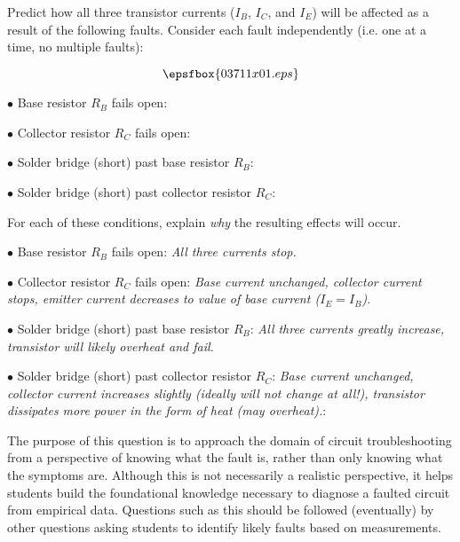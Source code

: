 

Predict how all three transistor currents ($I_B$, $I_C$, and $I_E$) will be affected as a result of the following faults.  Consider each fault independently (i.e. one at a time, no multiple faults):

$$\epsfbox{03711x01.eps}$$

\medskip
\item{$\bullet$} Base resistor $R_B$ fails open:
\vskip 5pt
\item{$\bullet$} Collector resistor $R_C$ fails open:
\vskip 5pt
\item{$\bullet$} Solder bridge (short) past base resistor $R_B$:
\vskip 5pt
\item{$\bullet$} Solder bridge (short) past collector resistor $R_C$:
\medskip

For each of these conditions, explain {\it why} the resulting effects will occur.







\medskip
\item{$\bullet$} Base resistor $R_B$ fails open: {\it All three currents stop.}
\vskip 5pt
\item{$\bullet$} Collector resistor $R_C$ fails open: {\it Base current unchanged, collector current stops, emitter current decreases to value of base current ($I_E = I_B$).}
\vskip 5pt
\item{$\bullet$} Solder bridge (short) past base resistor $R_B$: {\it All three currents greatly increase, transistor will likely overheat and fail.}
\vskip 5pt
\item{$\bullet$} Solder bridge (short) past collector resistor $R_C$: {\it Base current unchanged, collector current increases slightly (ideally will not change at all!), transistor dissipates more power in the form of heat (may overheat).}:
\medskip







The purpose of this question is to approach the domain of circuit troubleshooting from a perspective of knowing what the fault is, rather than only knowing what the symptoms are.  Although this is not necessarily a realistic perspective, it helps students build the foundational knowledge necessary to diagnose a faulted circuit from empirical data.  Questions such as this should be followed (eventually) by other questions asking students to identify likely faults based on measurements.




